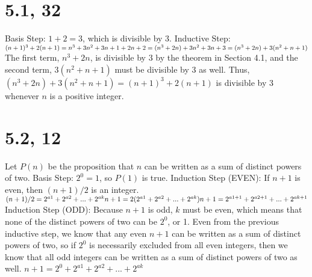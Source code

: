 \documentclass{article}
\begin{document}
\section{5.1, 32}
Basis Step: $1 + 2 = 3$, which is divisible by 3.
\newline
Inductive Step:
\newline
$(n + 1)^3 + 2(n + 1)
\newline
= n^3 + 3n^2 + 3n + 1 + 2n + 2
\newline
= (n^3 + 2n) + 3n^2 + 3n + 3
\newline
= (n^3 + 2n) + 3(n^2 + n + 1)$
\newline
The first term, $n^3 + 2n$, is divisible by 3 by the theorem in Section 4.1, and the second term, $3(n^2 + n + 1)$ must be divisible by 3 as well. Thus, $(n^3 + 2n) + 3(n^2 + n + 1) = (n + 1)^3 + 2(n + 1)$ is divisible by 3 whenever $n$ is a positive integer.

\newpage
\section{5.2, 12}
Let $P(n)$ be the proposition that $n$ can be written as a sum of distinct powers of two.
\newline
Basis Step: $2^0 = 1$, so $P(1)$ is true.
\newline
Induction Step (EVEN):
\newline
If $n + 1$ is even, then $(n + 1)/2$ is an integer.
\newline
$(n + 1)/2 = 2^{a1} + 2^{a2} + ... + 2^{ak}
\newline
n + 1 = 2(2^{a1} + 2^{a2} + ... + 2^{ak})
\newline
n + 1 = 2^{a1 + 1} + 2^{a2 + 1} + ... + 2^{ak + 1}$
\newline
Induction Step (ODD):
\newline
Because $n + 1$ is odd, $k$ must be even, which means that none of the distinct powers of two can be $2^0$, or 1. Even from the previous inductive step, we know that any even $n + 1$ can be written as a sum of distinct powers of two, so if $2^0$ is necessarily excluded from all even integers, then we know that all odd integers can be written as a sum of distinct powers of two as well.
\newline
$n + 1 = 2^0 + 2^{a1} + 2^{a2} + ... + 2^{ak}$
\end{document}
